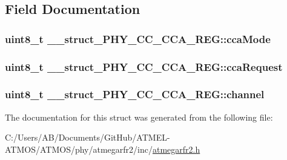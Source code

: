 \subsection{Field Documentation}
\hypertarget{struct____struct___p_h_y___c_c___c_c_a___r_e_g_a0f933841f08b6f4c1ef046b79b36e600}{
\subsubsection[{cca\-Mode}]{\setlength{\rightskip}{0pt plus 5cm}uint8\-\_\-t \-\_\-\-\_\-struct\-\_\-\-P\-H\-Y\-\_\-\-C\-C\-\_\-\-C\-C\-A\-\_\-\-R\-E\-G\-::cca\-Mode}}\label{struct____struct___p_h_y___c_c___c_c_a___r_e_g_a0f933841f08b6f4c1ef046b79b36e600}
\hypertarget{struct____struct___p_h_y___c_c___c_c_a___r_e_g_a641a5863159ac4d82fec4cd42e8126e9}{
\subsubsection[{cca\-Request}]{\setlength{\rightskip}{0pt plus 5cm}uint8\-\_\-t \-\_\-\-\_\-struct\-\_\-\-P\-H\-Y\-\_\-\-C\-C\-\_\-\-C\-C\-A\-\_\-\-R\-E\-G\-::cca\-Request}}\label{struct____struct___p_h_y___c_c___c_c_a___r_e_g_a641a5863159ac4d82fec4cd42e8126e9}
\hypertarget{struct____struct___p_h_y___c_c___c_c_a___r_e_g_a235cb675053a6716c529898ec4c4b174}{
\subsubsection[{channel}]{\setlength{\rightskip}{0pt plus 5cm}uint8\-\_\-t \-\_\-\-\_\-struct\-\_\-\-P\-H\-Y\-\_\-\-C\-C\-\_\-\-C\-C\-A\-\_\-\-R\-E\-G\-::channel}}\label{struct____struct___p_h_y___c_c___c_c_a___r_e_g_a235cb675053a6716c529898ec4c4b174}


The documentation for this struct was generated from the following file\-:\begin{DoxyCompactItemize}
\item 
C\-:/\-Users/\-A\-B/\-Documents/\-Git\-Hub/\-A\-T\-M\-E\-L-\/\-A\-T\-M\-O\-S/\-A\-T\-M\-O\-S/phy/atmegarfr2/inc/\hyperlink{atmegarfr2_8h}{atmegarfr2.\-h}\end{DoxyCompactItemize}
